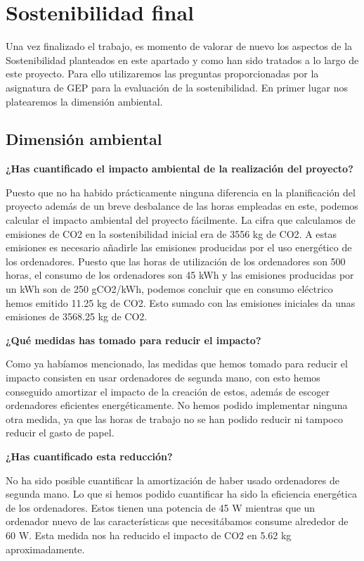 \section{Sostenibilidad final}

Una vez finalizado el trabajo, es momento de valorar de nuevo los aspectos de la Sostenibilidad planteados en este apartado y como han sido tratados a lo largo de este proyecto. Para ello utilizaremos las preguntas proporcionadas por la asignatura de GEP para la evaluación de la sostenibilidad. En primer lugar nos platearemos la dimensión ambiental.

\subsection{Dimensión ambiental}

\textbf{¿Has cuantificado el impacto ambiental de la realización del proyecto?}

Puesto que no ha habido prácticamente ninguna diferencia en la planificación del proyecto además de un breve desbalance de las horas empleadas en este, podemos calcular el impacto ambiental del proyecto fácilmente. La cifra que calculamos de emisiones de CO2 en la sostenibilidad inicial era de 3556 kg de CO2. A estas emisiones es necesario añadirle las emisiones producidas por el uso energético de los ordenadores. Puesto que las horas de utilización de los ordenadores son 500 horas, el consumo de los ordenadores son 45 kWh y las emisiones producidas por un kWh son de 250 gCO2/kWh, podemos concluir que en consumo eléctrico hemos emitido 11.25 kg de CO2. Esto sumado con las emisiones iniciales da unas emisiones de 3568.25 kg de CO2.

\textbf{¿Qué medidas has tomado para reducir el impacto?}

Como ya habíamos mencionado, las medidas que hemos tomado para reducir el impacto consisten en usar ordenadores de segunda mano, con esto hemos conseguido amortizar el impacto de la creación de estos, además de escoger ordenadores eficientes energéticamente. No hemos podido implementar ninguna otra medida, ya que las horas de trabajo no se han podido reducir ni tampoco reducir el gasto de papel.

\textbf{¿Has cuantificado esta reducción?}

No ha sido posible cuantificar la amortización de haber usado ordenadores de segunda mano. Lo que si hemos podido cuantificar ha sido la eficiencia energética de los ordenadores. Estos tienen una potencia de 45 W mientras que un ordenador nuevo de las características que necesitábamos consume alrededor de 60 W. Esta medida nos ha reducido el impacto de CO2 en 5.62 kg aproximadamente.

